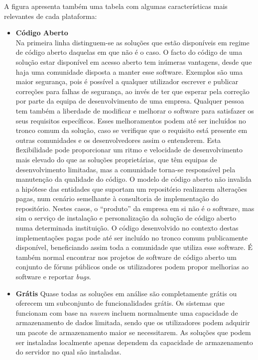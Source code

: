 \documentclass[sigconf,nonacm]{acmart}
\begin{document}
A figura apresenta também uma tabela com algumas características mais relevantes de cada plataforma:


\begin{itemize}
	\item \textbf{Código Aberto}\\
	Na primeira linha distinguem-se as soluções que estão disponíveis em regime de código aberto daquelas em que não é o caso. O facto do código de uma solução estar disponível em acesso aberto tem inúmeras vantagens, desde que haja uma comunidade disposta a manter esse software. Exemplos são uma maior segurança, pois é possível a qualquer utilizador escrever e publicar correções para falhas de segurança, ao invés de ter que esperar pela correção por parte da equipa de desenvolvimento de uma empresa. 
%
Qualquer pessoa tem também a liberdade de modificar e melhorar o software para satisfazer os seus requisitos específicos. Esses melhoramentos podem até ser incluídos no tronco comum da solução, caso se verifique que o requisito está presente em outras comunidades e os desenvolvedores assim o entenderem.
%
Esta flexibilidade pode proporcionar um ritmo e velocidade de desenvolvimento mais elevado do que as soluções proprietárias, que têm equipas de desenvolvimento limitadas, mas a comunidade torna-se responsável pela manutenção da qualidade do código. 
%
O modelo de código aberto não invalida a hipótese das entidades que suportam um repositório realizarem alterações pagas, num cenário semelhante à consultoria de implementação do repositório. Nestes casos, o ``produto'' da empresa em si não é o software, mas sim o serviço de instalação e personalização da solução de código aberto numa determinada instituição. 
%
O código desenvolvido no contexto destas implementações pagas pode até ser incluído no tronco comum publicamente disponível, beneficiando assim toda a comunidade que utiliza esse software. É também normal encontrar nos projetos de software de código aberto um conjunto de fóruns públicos onde os utilizadores podem propor melhorias ao software e reportar \textit{bugs}.
	\item \textbf{Grátis}
	Quase todas as soluções em análise são completamente grátis ou oferecem um subconjunto de funcionalidades grátis. Os sistemas que funcionam com base na \emph{nuvem} incluem normalmente uma capacidade de armazenamento de dados limitada, sendo que os utilizadores podem adquirir um pacote de armazenamento maior se necessitarem. As soluções que podem ser instaladas localmente apenas dependem da capacidade de armazenamento do servidor no qual são instaladas.

\end{itemize}
\end{document}
